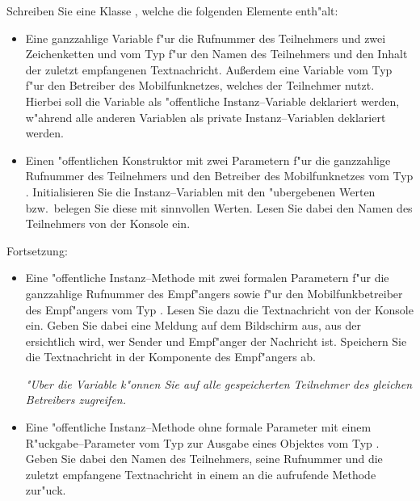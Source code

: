 \documentclass[9pt,german]{beamer}%
\begin{document}
\begin{frame}

Schreiben Sie eine Klasse , welche die folgenden
Elemente enth"alt:
\begin{itemize}
\item
Eine ganzzahlige Variable 
f"ur die Rufnummer des Teilnehmers und zwei Zeichenketten  und  vom Typ 
f"ur den Namen des Teilnehmers und den Inhalt der zuletzt
empfangenen Textnachricht. Au\ss erdem eine Variable 
vom Typ   f"ur den Betreiber des Mobilfunknetzes, welches der Teilnehmer nutzt. \\
Hierbei soll die Variable  als "offentliche Instanz--Variable deklariert werden,
w"ahrend alle anderen Variablen als private Instanz--Variablen deklariert werden.
\item
Einen "offentlichen Konstruktor mit zwei Parametern f"ur die
ganzzahlige Rufnummer des Teilnehmers und den Betreiber des
Mobilfunknetzes vom Typ . Initialisieren Sie
die Instanz--Variablen mit den "ubergebenen Werten bzw.\ belegen
Sie diese mit sinnvollen Werten.
Lesen Sie dabei den Namen des Teilnehmers von der Konsole ein.
\end{itemize}
\end{frame}

\begin{frame}
Fortsetzung:
\begin{itemize}
\item
Eine "offentliche Instanz--Methode 
mit zwei formalen Parametern f"ur die ganzzahlige Rufnummer des Empf"angers sowie
f"ur den Mobilfunkbetreiber des Empf"angers vom Typ .
Lesen Sie dazu die Textnachricht von der Konsole ein. Geben Sie dabei
eine Meldung auf dem Bildschirm aus, aus der ersichtlich wird,
wer Sender und Empf"anger der Nachricht ist.
Speichern Sie die Textnachricht in der Komponente  des Empf"angers ab.

\emph{"Uber die Variable  k"onnen Sie auf alle gespeicherten Teilnehmer  des gleichen Betreibers zugreifen.}

\item
Eine "offentliche Instanz--Methode  ohne formale Parameter mit einem
R"uckgabe--Parameter vom Typ  zur Ausgabe eines
Objektes vom Typ .
Geben Sie dabei den Namen des Teilnehmers,
seine Rufnummer und die zuletzt empfangene
Textnachricht in einem  an die aufrufende Methode zur"uck.
\end{itemize}
\end{frame}
\end{document}
